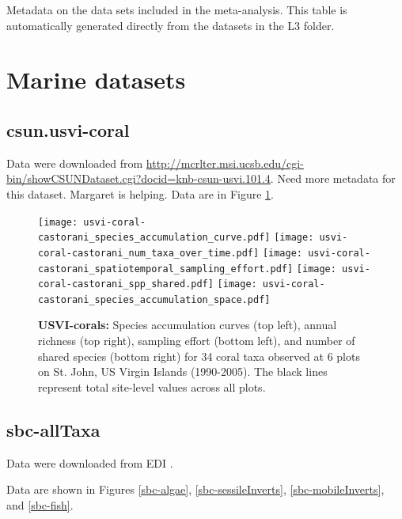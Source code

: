 \documentclass[11pt, oneside]{article}
\begin{document}
\begin{table}[h!]
\scriptsize
   \centering
     \caption{Metadata on the data sets included in the meta-analysis. This table is automatically generated directly from the datasets in the L3 folder.} 

   \label{metadata} 
\end{table}


\section {Marine datasets}


\subsection {csun.usvi-coral}
Data were downloaded from \url{http://mcrlter.msi.ucsb.edu/cgi-bin/showCSUNDataset.cgi?docid=knb-csun-usvi.101.4}.
Need more metadata for this dataset.
Margaret is helping.
Data are in Figure \ref{usvi-coral}.

\begin{figure}[h!]
\centering
\texttt{[image: usvi-coral-castorani\_species\_accumulation\_curve.pdf]}
\texttt{[image: usvi-coral-castorani\_num\_taxa\_over\_time.pdf]}
\texttt{[image: usvi-coral-castorani\_spatiotemporal\_sampling\_effort.pdf]}
\texttt{[image: usvi-coral-castorani\_spp\_shared.pdf]}
\texttt{[image: usvi-coral-castorani\_species\_accumulation\_space.pdf]}
\caption{{\bf USVI-corals:} Species accumulation curves (top left),  annual richness (top right), sampling effort (bottom left), and number of shared species (bottom right)  for 34 coral taxa observed at 6 plots on St. John, US Virgin Islands (1990-2005). The black lines represent total site-level values across all plots.}
\label{usvi-coral}
\end{figure}

\subsection {sbc-allTaxa}
Data were downloaded from EDI \citep{sbc}. 

Data are shown in Figures \ref{sbc-algae},  \ref{sbc-sessileInverts}, \ref{sbc-mobileInverts}, and \ref{sbc-fish}.
\end{document}
